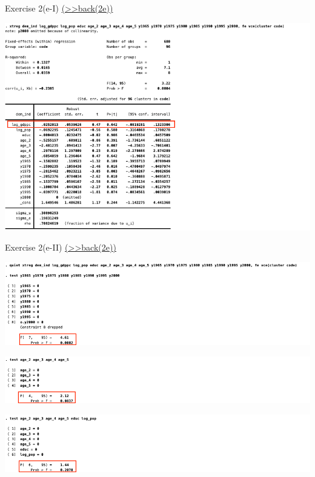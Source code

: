 \documentclass[
  10pt,
  ignorenonframetext,
]{beamer}
\begin{document}
\begin{frame}{Exercise 2(e-I)
\footnotesize \protect\hyperlink{Ex2-BothFEswithcontrols-A}{(\textgreater\textgreater back(2e))}
\normalsize }
\protect\hypertarget{Ex2-BothFEswithcontrols}{}
\begin{flushleft}\includegraphics[width=0.9\linewidth]{pictures/Ex2-BothFEswithcontrols} \end{flushleft}
\end{frame}

\begin{frame}{Exercise 2(e-II)
\footnotesize \protect\hyperlink{Ex2-BothFEswithcontrols-A}{(\textgreater\textgreater back(2e))}
\normalsize}
\protect\hypertarget{exercise-2e-ii-back2e}{}
\begin{flushleft}\includegraphics[width=0.9\linewidth]{pictures/Ex2-BothFEswithcontrolsTest-1} \end{flushleft}

\begin{flushleft}\includegraphics[width=0.9\linewidth]{pictures/Ex2-BothFEswithcontrolsTest-2} \end{flushleft}

\begin{flushleft}\includegraphics[width=0.9\linewidth]{pictures/Ex2-BothFEswithcontrolsTest-3} \end{flushleft}
\end{frame}
\end{document}
